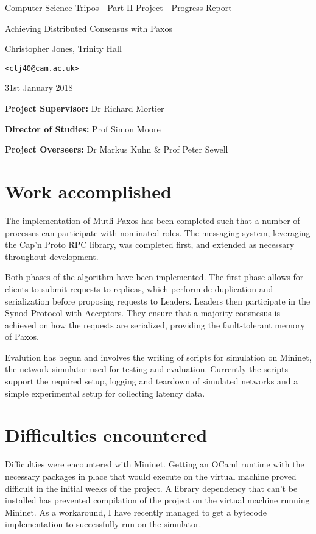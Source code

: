\documentclass[11pt,a4]{report}
\begin{document}
\vfil

\centerline{\Large Computer Science Tripos - Part II Project - Progress Report}
\vspace{0.2in}
\centerline{\Large Achieving Distributed Consensus with Paxos}
\vspace{0.2in}
\centerline{\large Christopher Jones, Trinity Hall}
\vspace{0.1in}
\centerline{\large \texttt{<clj40@cam.ac.uk>}}
\vspace{0.1in}
\centerline{\large 31st January 2018}

\vspace{0.4in}

\noindent
{\bf Project Supervisor:} Dr Richard Mortier
\vspace{0.0in}

\noindent
{\bf Director of Studies:} Prof Simon Moore
\vspace{0.0in}
\noindent
 
\noindent
{\bf Project Overseers:} Dr Markus Kuhn \& Prof Peter Sewell


\section*{Work accomplished}


The implementation of Mutli Paxos has been completed such that a number of processes can participate with nominated roles. The messaging system, leveraging the Cap'n Proto RPC library, was completed first, and extended as necessary throughout development.

Both phases of the algorithm have been implemented. The first phase allows for clients to submit requests to replicas, which perform de-duplication and serialization before proposing requests to Leaders. Leaders then participate in the Synod Protocol with Acceptors. They ensure that a majority consnesus is achieved on how the requests are serialized, providing the fault-tolerant memory of Paxos.

Evalution has begun and involves the writing of scripts for simulation on Mininet, the network simulator used for testing and evaluation. Currently the scripts support the required setup, logging and teardown of simulated networks and a simple experimental setup for collecting latency data.

\section*{Difficulties encountered}
Difficulties were encountered with Mininet. Getting an OCaml runtime with the necessary packages in place that would execute on the virtual machine proved difficult in the initial weeks of the project. A  library dependency that can't be installed has prevented compilation of the project on the virtual machine running Mininet. As a workaround, I have recently managed to get a bytecode implementation to successfully run on the simulator.
\end{document}
